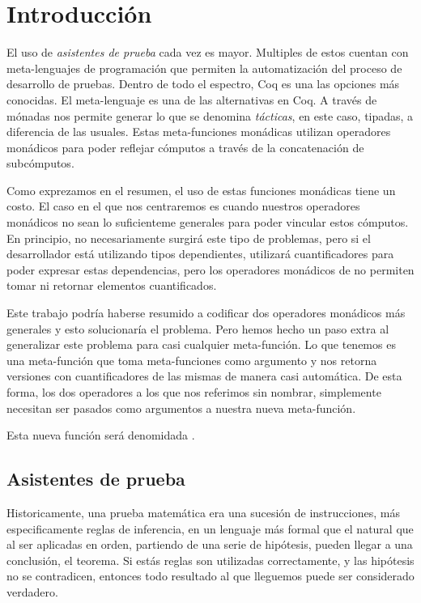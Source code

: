 \chapter{Introducción}\label{ch:intro}

El uso de \emph{asistentes de prueba} cada vez es mayor.
Multiples de estos cuentan con meta-lenguajes de programación que permiten la automatización del proceso de desarrollo de pruebas.
Dentro de todo el espectro, Coq \cite{CIC} es una las opciones más conocidas.
El meta-lenguaje \mtac \cite{DBLP:journals/pacmpl/KaiserZKRD18} es una de las alternativas en Coq.
A través de mónadas nos permite generar lo que se denomina \emph{tácticas}, en este caso, tipadas, a diferencia de las usuales.
Estas meta-funciones monádicas utilizan operadores monádicos para poder reflejar cómputos a través de la concatenación de subcómputos.

Como exprezamos en el resumen, el uso de estas funciones monádicas tiene un costo.
El caso en el que nos centraremos es cuando nuestros operadores monádicos no sean lo suficienteme generales para poder vincular estos cómputos.
En principio, no necesariamente surgirá este tipo de problemas, pero si el desarrollador está utilizando tipos dependientes, utilizará cuantificadores para poder expresar estas dependencias, pero los operadores monádicos de \mtac no permiten tomar ni retornar elementos cuantificados.

Este trabajo podría haberse resumido a codificar dos operadores monádicos más generales y esto solucionaría el problema.
Pero hemos hecho un paso extra al generalizar este problema para casi cualquier meta-función.
Lo que tenemos es una meta-función que toma meta-funciones como argumento y nos retorna versiones con cuantificadores de las mismas de manera casi automática.
De esta forma, los dos operadores a los que nos referimos sin nombrar, simplemente necesitan ser pasados como argumentos a nuestra nueva meta-función.

Esta nueva función será denomidada \lift.

\section{Asistentes de prueba}

Historicamente, una prueba matemática era una sucesión de instrucciones, más especificamente reglas de inferencia, en un lenguaje más formal que el natural que al ser aplicadas en orden, partiendo de una serie de hipótesis, pueden llegar a una conclusión, el teorema.
Si estás reglas son utilizadas correctamente, y las hipótesis no se contradicen, entonces todo resultado al que lleguemos puede ser considerado verdadero.

